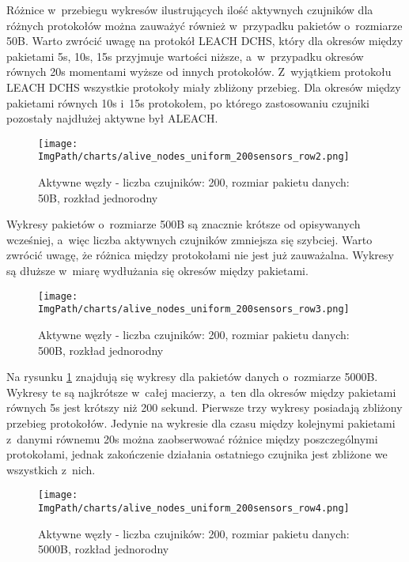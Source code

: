 Różnice w~przebiegu wykresów ilustrujących ilość aktywnych czujników dla różnych protokołów można zauważyć również w~przypadku pakietów o~rozmiarze 50B. Warto zwrócić uwagę na protokół LEACH DCHS, który dla okresów między pakietami 5s, 10s, 15s przyjmuje wartości niższe, a~w~przypadku okresów równych 20s momentami wyższe od innych protokołów.  Z~wyjątkiem protokołu LEACH DCHS wszystkie protokoły miały zbliżony przebieg. Dla okresów między pakietami równych 10s i~15s protokołem, po którego zastosowaniu czujniki pozostały najdłużej aktywne był ALEACH.

\begin{figure}[H]
	\begin{center}
		\texttt{[image: \\ImgPath/charts/alive\_nodes\_uniform\_200sensors\_row2.png]}
	\end{center}
	\caption{Aktywne węzły - liczba czujników: 200, rozmiar pakietu danych: 50B, rozkład jednorodny}
\end{figure}

Wykresy pakietów o~rozmiarze 500B są znacznie krótsze od opisywanych wcześniej, a~więc liczba aktywnych czujników zmniejsza się szybciej. Warto zwrócić uwagę, że różnica między protokołami nie jest już zauważalna. Wykresy są dłuższe w~miarę wydłużania się okresów między pakietami.

\begin{figure}[H]
	\begin{center}
		\texttt{[image: \\ImgPath/charts/alive\_nodes\_uniform\_200sensors\_row3.png]}
	\end{center}
	\caption{Aktywne węzły - liczba czujników: 200, rozmiar pakietu danych: 500B, rozkład jednorodny}
\end{figure}

Na rysunku \ref{fig:aliveNodesUniform200sensorsRow4} znajdują się wykresy dla pakietów danych o~rozmiarze 5000B. Wykresy te są najkrótsze w~całej macierzy, a~ten dla okresów między pakietami równych 5s jest krótszy niż 200 sekund. Pierwsze trzy wykresy posiadają zbliżony przebieg protokołów. Jedynie na wykresie dla czasu między kolejnymi pakietami z~danymi równemu 20s można zaobserwować różnice między poszczególnymi protokołami, jednak zakończenie działania ostatniego czujnika jest zbliżone we wszystkich z~nich.

\begin{figure}[H]
	\begin{center}
		\texttt{[image: \\ImgPath/charts/alive\_nodes\_uniform\_200sensors\_row4.png]}
	\end{center}
	\caption{Aktywne węzły - liczba czujników: 200, rozmiar pakietu danych: 5000B, rozkład jednorodny}
	\label{fig:aliveNodesUniform200sensorsRow4}
\end{figure}

